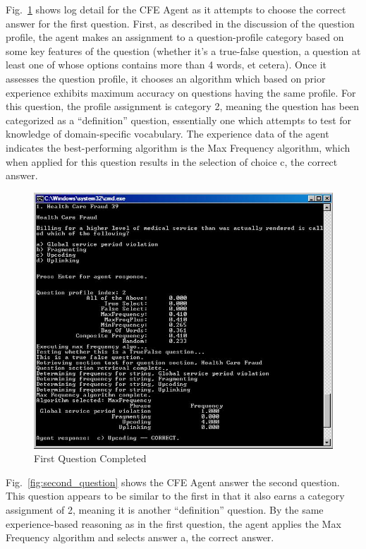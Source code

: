 Fig.~\ref{fig:first_question_completed} shows log detail for the CFE Agent as it attempts to choose the correct answer for the first question.  First, as described in the discussion of the question profile, the agent makes an assignment to a question-profile category based on some key features of the question (whether it's a true-false question, a question at least one of whose options contains more than 4 words, et cetera).  Once it assesses the question profile, it chooses an algorithm which based on prior experience exhibits maximum accuracy on questions having the same profile.  For this question, the profile assignment is category 2, meaning the question has been categorized as a ``definition'' question,  essentially one which attempts to test for knowledge of domain-specific vocabulary.  The experience data of the agent indicates the best-performing algorithm is the Max Frequency algorithm, which when applied for this question results in the selection of choice c, the correct answer.

\begin{figure}
\centering
\includegraphics[scale=0.75]{screen_shot_4.jpg}
\caption{First Question Completed}
\label{fig:first_question_completed}
\end{figure}

Fig.~\ref{fig:second_question} shows the CFE Agent answer the second question.  This question appears to be similar to the first in that it also earns a category assignment of 2, meaning it is another ``definition'' question.  By the same experience-based reasoning as in the first question, the agent applies the Max Frequency algorithm and selects answer a, the correct answer.

